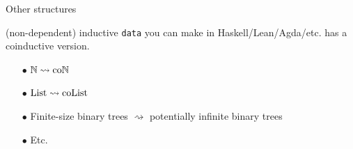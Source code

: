 
\begin{frame}{Other structures} %
  
  \par {} (non-dependent) inductive \texttt{data} you can make in Haskell/Lean/Agda/etc. has a coinductive version.

  \pause

  \begin{itemize}
    \item[$\bullet$] {
      $\mathbb{N} \rightsquigarrow \mathrm{co}\mathbb{N}$
    }\pause
    \item[$\bullet$] {
      $\operatorname{List} \rightsquigarrow \operatorname{coList}$
    }\pause
    \item[$\bullet$] {
      Finite-size binary trees $\rightsquigarrow$ potentially infinite binary trees
    }\pause
    \item[$\bullet$] {
      Etc.
    }
  \end{itemize}

\end{frame}